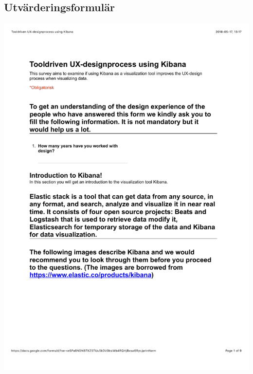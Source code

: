 \documentclass[12pt]{kththesis}
\begin{document}
\begin{appendices}
\renewcommand\thechapter{A}                     
\section{Utvärderingsformulär} 
\includegraphics[width=1\textwidth]{UX_designprocess1.pdf}
\newpage

\end{appendices}
\end{document}
